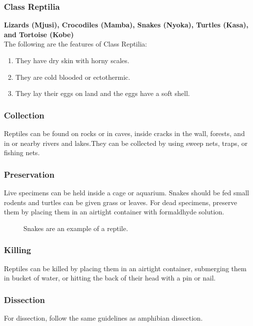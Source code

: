 \subsubsection{Class Reptilia}
\textbf{Lizards (Mjusi), Crocodiles (Mamba), Snakes (Nyoka), Turtles (Kasa), and Tortoise (Kobe)}\\The following are the features of Class Reptilia:
\begin{enumerate}
\item{They have dry skin with horny scales.}
\item{They are cold blooded or ectothermic.}
\item{They lay their eggs on land and the eggs have a soft shell.}
\end{enumerate}

\subsubsection{Collection}
Reptiles can be found on rocks or in caves, inside cracks in the wall, forests, and in or nearby rivers and lakes.They can be collected by using sweep nets, traps, or fishing nets.

\subsubsection{Preservation} 
Live specimens can be held inside a cage or aquarium. Snakes should be fed small rodents and turtles can be given grass or leaves. For dead specimens, preserve them by placing them in an airtight container with formaldhyde solution.

\begin{figure}[h]
\begin{center}
\def\svgwidth{8cm}

\caption{Snakes are an example of a reptile.}
\label{fig:snake}
\end{center}
\end{figure}
\subsubsection{Killing}
Reptiles can be killed by placing them in an airtight container, submerging them in bucket of water, or hitting the back of their head with a pin or nail.

\subsubsection{Dissection}
For dissection, follow the same guidelines as amphibian dissection.

